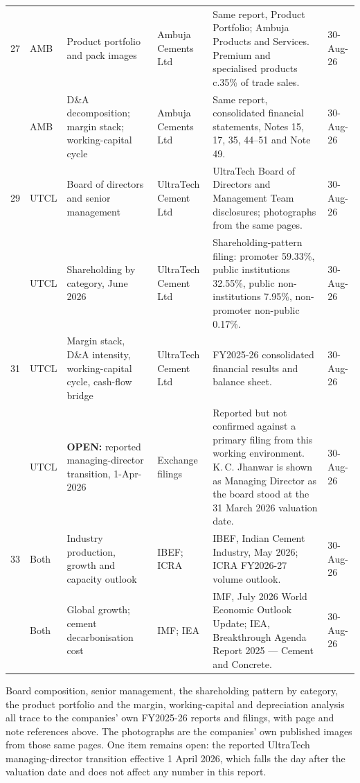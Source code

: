 {\begin{tabular}{@{}p{}p{}p{}p{}p{}p{}@{}}
27 & AMB & Product portfolio and pack images & Ambuja Cements Ltd & Same report, Product Portfolio; Ambuja Products and Services. Premium and specialised products c.35\% of trade sales. & 30-Aug-26\\
\arow 28 & AMB & D\&A decomposition; margin stack; working-capital cycle & Ambuja Cements Ltd & Same report, consolidated financial statements, Notes 15, 17, 35, 44--51 and Note 49. & 30-Aug-26\\
29 & UTCL & Board of directors and senior management & UltraTech Cement Ltd & UltraTech Board of Directors and Management Team disclosures; photographs from the same pages. & 30-Aug-26\\
\arow 30 & UTCL & Shareholding by category, June 2026 & UltraTech Cement Ltd & Shareholding-pattern filing: promoter 59.33\%, public institutions 32.55\%, public non-institutions 7.95\%, non-promoter non-public 0.17\%. & 30-Aug-26\\
31 & UTCL & Margin stack, D\&A intensity, working-capital cycle, cash-flow bridge & UltraTech Cement Ltd & FY2025-26 consolidated financial results and balance sheet. & 30-Aug-26\\
\arow 32 & UTCL & \textbf{OPEN:} reported managing-director transition, 1-Apr-2026 & Exchange filings & Reported but not confirmed against a primary filing from this working environment. K.\,C. Jhanwar is shown as Managing Director as the board stood at the 31 March 2026 valuation date. & 30-Aug-26\\
33 & Both & Industry production, growth and capacity outlook & IBEF; ICRA & IBEF, Indian Cement Industry, May 2026; ICRA FY2026-27 volume outlook. & 30-Aug-26\\
\arow 34 & Both & Global growth; cement decarbonisation cost & IMF; IEA & IMF, July 2026 World Economic Outlook Update; IEA, Breakthrough Agenda Report 2025 --- Cement and Concrete. & 30-Aug-26\\
\end{tabular}\par}

\vspace{2mm}
\begin{okbox}
Board composition, senior management, the shareholding pattern by category, the
product portfolio and the margin, working-capital and depreciation analysis all trace
to the companies' own FY2025-26 reports and filings, with page and note references
above. The photographs are the companies' own published images from those same pages.
One item remains open: the reported UltraTech managing-director transition effective
1 April 2026, which falls the day after the valuation date and does not affect any
number in this report.
\end{okbox}

